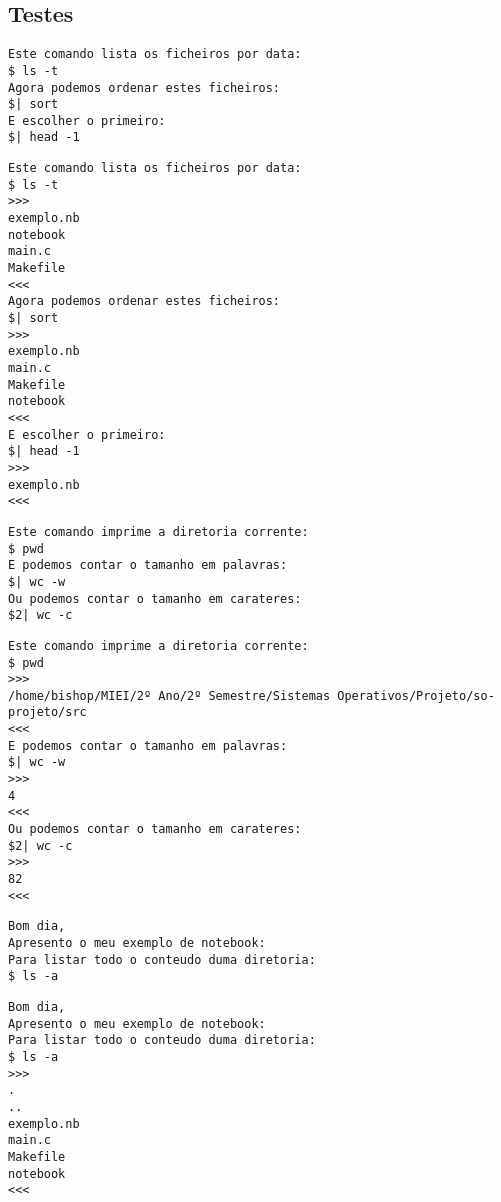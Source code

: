 \documentclass[a4paper]{article}
\begin{document}
\subsection{Testes}
\label{sec:testes}

\begin{lstlisting}[caption=1º Exemplo]
Este comando lista os ficheiros por data:
$ ls -t
Agora podemos ordenar estes ficheiros:
$| sort
E escolher o primeiro:
$| head -1
\end{lstlisting}

\begin{lstlisting}[caption=Resultado do 1º Exemplo]
Este comando lista os ficheiros por data:
$ ls -t
>>>
exemplo.nb
notebook
main.c
Makefile
<<<
Agora podemos ordenar estes ficheiros:
$| sort
>>>
exemplo.nb
main.c
Makefile
notebook
<<<
E escolher o primeiro:
$| head -1
>>>
exemplo.nb
<<<
\end{lstlisting}


\begin{lstlisting}[caption=2º Exemplo]
Este comando imprime a diretoria corrente:
$ pwd
E podemos contar o tamanho em palavras:
$| wc -w
Ou podemos contar o tamanho em carateres:
$2| wc -c
\end{lstlisting}


\begin{lstlisting}[caption=Resultado do 2º Exemplo]
Este comando imprime a diretoria corrente:
$ pwd
>>>
/home/bishop/MIEI/2º Ano/2º Semestre/Sistemas Operativos/Projeto/so-projeto/src
<<<
E podemos contar o tamanho em palavras:
$| wc -w
>>>
4
<<<
Ou podemos contar o tamanho em carateres:
$2| wc -c
>>>
82
<<<
\end{lstlisting}


\begin{lstlisting}[caption=3º Exemplo]
Bom dia,
Apresento o meu exemplo de notebook:
Para listar todo o conteudo duma diretoria:
$ ls -a
\end{lstlisting}


\begin{lstlisting}[caption=Resultado do 3º Exemplo]
Bom dia,
Apresento o meu exemplo de notebook:
Para listar todo o conteudo duma diretoria:
$ ls -a
>>>
.
..
exemplo.nb
main.c
Makefile
notebook
<<<

\end{lstlisting}
\end{document}
